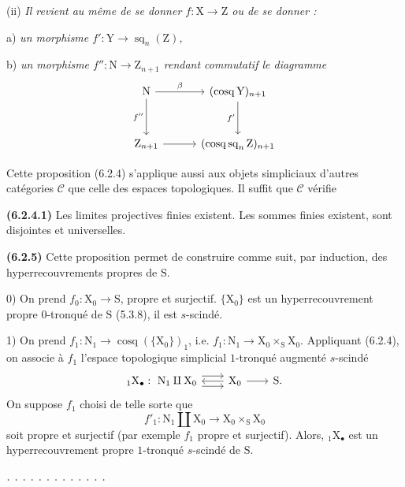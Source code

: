 \documentclass[11pt,leqno]{article}
\newcommand{\Page}[1]{\ifvmode\noindent\else\unskip\ \fi{\footnotesize\textcolor{gray}{[p.\,#1]}}\ \ignorespaces}
\begin{document}
(ii) \textit{Il revient au même de se donner \(f:\mathrm{X}\to\mathrm{Z}\) ou de se donner :}

a) \textit{un morphisme \(f':\mathrm{Y}\to\operatorname{sq}_n(\mathrm{Z})\),}

b) \textit{un morphisme \(f'':\mathrm{N}\to\mathrm{Z}_{n+1}\) rendant commutatif le diagramme}
\[
\begin{tikzcd}[column sep=3em,row sep=3em]
\mathrm{N}\arrow[r,"\beta"]\arrow[d,"f''"']
  & (\operatorname{cosq}\mathrm{Y})_{n+1}\arrow[d,"f'"']\\
\mathrm{Z}_{n+1}\arrow[r]
  & (\operatorname{cosq}\operatorname{sq}_n\mathrm{Z})_{n+1}
\end{tikzcd}
\]

Cette proposition (6.2.4) s’applique aussi aux objets simpliciaux d’autres catégories \(\mathcal{C}\) que celle des espaces topologiques. Il suffit que \(\mathcal{C}\) vérifie
\Page{20}

\textbf{(6.2.4.1)} Les limites projectives finies existent. Les sommes finies existent, sont disjointes et universelles.

\textbf{(6.2.5)} Cette proposition permet de construire comme suit, par induction, des hyperrecouvrements propres de \(\mathrm{S}\).

0) On prend \(f_0:\mathrm{X}_0\to\mathrm{S}\), propre et surjectif. \(\{\mathrm{X}_0\}\) est un hyperrecouvrement propre \(0\)-tronqué de \(\mathrm{S}\) (5.3.8), il est \(s\)-scindé.

1) On prend \(f_1:\mathrm{N}_1\to\operatorname{cosq}(\{\mathrm{X}_0\})_1\), i.e. \(f_1:\mathrm{N}_1\to\mathrm{X}_0\times_{\mathrm{S}}\mathrm{X}_0\). Appliquant (6.2.4), on associe à \(f_1\) l’espace topologique simplicial \(1\)-tronqué augmenté \(s\)-scindé
\[
\begin{tikzcd}[column sep=2em]
{}_{1}\mathrm{X}_{\bullet}:\ \mathrm{N}_1\amalg\mathrm{X}_0
  \arrow[r,shift left=1.1ex]\arrow[r,shift right=1.1ex]
  & \mathrm{X}_0\arrow[l]\arrow[r] & \mathrm{S}.
\end{tikzcd}
\]
On suppose \(f_1\) choisi de telle sorte que
\[
f'_1:\mathrm{N}_1\amalg\mathrm{X}_0
\to\mathrm{X}_0\times_{\mathrm{S}}\mathrm{X}_0
\]
soit propre et surjectif (par exemple \(f_1\) propre et surjectif). Alors, \({}_{1}\mathrm{X}_{\bullet}\) est un hyperrecouvrement propre \(1\)-tronqué \(s\)-scindé de \(\mathrm{S}\).

\noindent\(\ldotp\;\ldotp\;\ldotp\;\ldotp\;\ldotp\;\ldotp\;\ldotp\;\ldotp\;\ldotp\;\ldotp\;\ldotp\;\ldotp\;\ldotp\)
\end{document}
